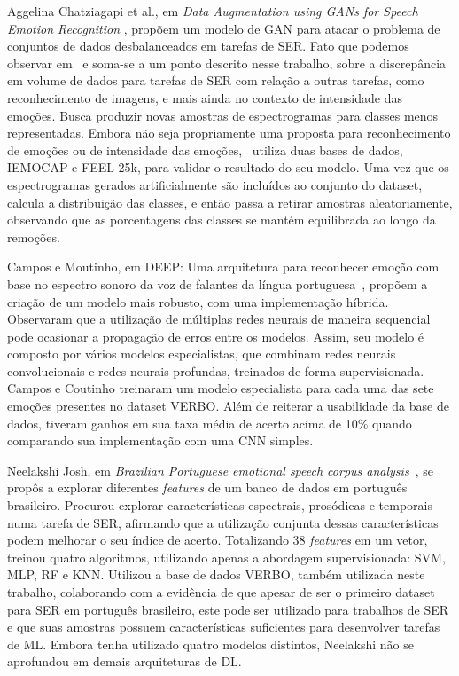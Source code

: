 Aggelina Chatziagapi et al., em \textit{Data Augmentation using GANs for Speech Emotion Recognition }\cite{32.89}, propõem um modelo de \acrshort{GAN} para atacar o problema de conjuntos de dados desbalanceados em tarefas de \acrshort{SER}. Fato que podemos observar em~\cite{32.32} e soma-se a um ponto descrito nesse trabalho, sobre a discrepância em volume de dados para tarefas de \acrshort{SER} com relação a outras tarefas, como reconhecimento de imagens, e mais ainda no contexto de intensidade das emoções. Busca produzir novas amostras de espectrogramas para classes menos representadas. Embora não seja propriamente uma proposta para reconhecimento de emoções ou de intensidade das emoções,~\cite{32.89} utiliza duas bases de dados, IEMOCAP e FEEL-25k, para validar o resultado do seu modelo. Uma vez que os espectrogramas gerados artificialmente são incluídos ao conjunto do dataset, calcula a distribuição das classes, e então passa a retirar amostras aleatoriamente, observando que as porcentagens das classes se mantém equilibrada ao longo da remoções.

Campos e Moutinho, em DEEP: Uma arquitetura para reconhecer emoção com base no espectro sonoro da voz de falantes da língua portuguesa~\cite{12}, propõem a criação de um modelo mais robusto, com uma implementação híbrida. Observaram que a utilização de múltiplas redes neurais de maneira sequencial pode ocasionar a propagação de erros entre os modelos. Assim, seu modelo é composto por vários modelos especialistas, que combinam redes neurais convolucionais e redes neurais profundas, treinados de forma supervisionada. Campos e Coutinho treinaram um modelo especialista para cada uma das sete emoções presentes no dataset VERBO. Além de reiterar a usabilidade da base de dados, tiveram ganhos em sua taxa média de acerto acima de 10\% quando comparando sua implementação com uma \acrshort{CNN} simples.

Neelakshi Josh, em \textit{Brazilian Portuguese emotional speech corpus analysis}~\cite{20}, se propôs a explorar diferentes \textit{features} de um banco de dados em português brasileiro. Procurou explorar características espectrais, prosódicas e temporais numa tarefa de \acrshort{SER}, afirmando que a utilização conjunta dessas características podem melhorar o seu índice de acerto. Totalizando 38 \textit{features} em um vetor, treinou quatro algoritmos, utilizando apenas a abordagem supervisionada: \acrshort{SVM}, \acrshort{MLP}, \acrshort{RF} e \acrshort{KNN}. Utilizou a base de dados VERBO, também utilizada neste trabalho, colaborando com a evidência de que apesar de ser o primeiro dataset para \acrshort{SER} em português brasileiro, este pode ser utilizado para trabalhos de \acrshort{SER} e que suas amostras possuem características suficientes para desenvolver tarefas de \acrshort{ML}. Embora tenha utilizado quatro modelos distintos, Neelakshi não se aprofundou em demais arquiteturas de \acrshort{DL}.

